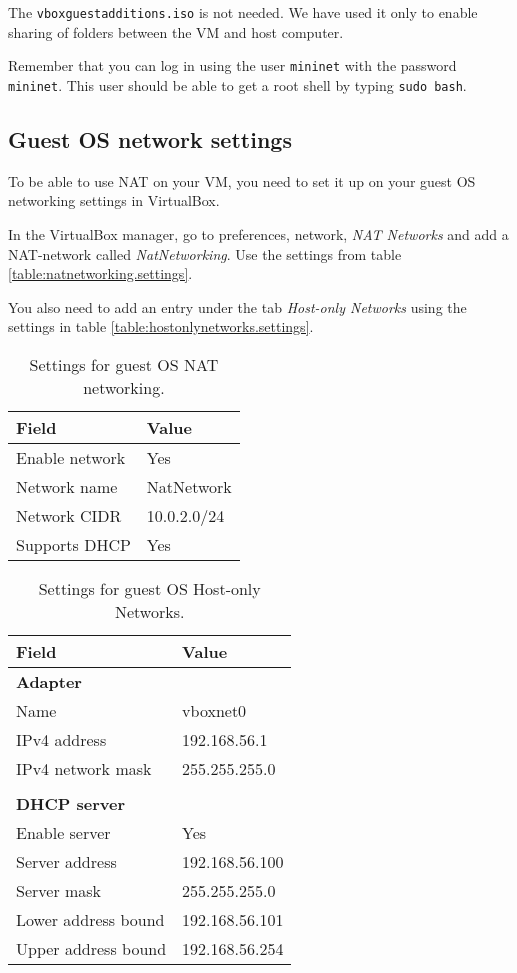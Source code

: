 The \texttt{vboxguestadditions.iso} is not needed. We have used it only to
enable sharing of folders between the VM and host computer.

Remember that you can log in using the user \texttt{mininet} with the
password \texttt{mininet}.  This user should be able to get a root shell by
typing \texttt{sudo bash}.

\subsection{Guest OS network settings}
\label{chapter:guest.settings}

To be able to use \acs{NAT} on your VM, you need to set it up on your guest
OS networking settings in VirtualBox.

In the VirtualBox manager, go to preferences, network, \textit{NAT Networks}
and add a \acs{NAT}-network called \textit{NatNetworking}. Use the settings
from table \vref{table:natnetworking.settings}.

You also need to add an entry under the tab \textit{Host-only Networks}
using the settings in table \vref{table:hostonlynetworks.settings}.

\begin{table}[H]
  \centering
  \begin{tabular}{ll}
    \hline \textbf{Field} & \textbf{Value} \\
    \hline
      Enable network & Yes \\
      Network name & NatNetwork \\
      Network CIDR & 10.0.2.0/24 \\
      Supports DHCP & Yes \\
    \hline
  \end{tabular}
  \caption{Settings for guest OS NAT networking.}
  \label{table:natnetworking.settings}
\end{table}

\begin{table}[H]
  \centering
  \begin{tabular}{ll}
    \hline \textbf{Field} & \textbf{Value} \\
    \hline
      \textbf{Adapter} & \\
      Name & vboxnet0 \\
      IPv4 address & 192.168.56.1 \\
      IPv4 network mask & 255.255.255.0 \\
       & \\
      \textbf{DHCP server} & \\
      Enable server & Yes \\
      Server address & 192.168.56.100 \\
      Server mask & 255.255.255.0 \\
      Lower address bound & 192.168.56.101 \\
      Upper address bound & 192.168.56.254 \\
    \hline
  \end{tabular}
  \caption{Settings for guest OS Host-only Networks.}
  \label{table:hostonlynetworks.settings}
\end{table}

